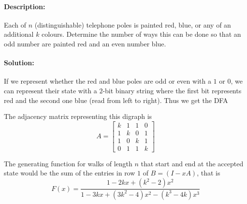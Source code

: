 \documentclass[a4paper,notitlepage]{article}
\theoremstyle{plain}
\theoremstyle{definition}
\begin{document}
\paragraph{Description:}
Each of $n$ (distinguishable) telephone poles is painted red, blue, or any of an additional $k$ colours. Determine the number of ways this can be done so that an odd number are painted red and an even number blue.

\paragraph{Solution:}
If we represent whether the red and blue poles are odd or even with a $1$ or $0$, we can represent their state with a $2$-bit binary string where the first bit represents red and the second one blue (read from left to right). Thus we get the DFA

\begin{center}
\end{center}

The adjacency matrix representing this digraph is
\begin{equation*}
    A = \begin{bmatrix}
        k & 1 & 1 & 0 \\
        1 & k & 0 & 1 \\
        1 & 0 & k & 1 \\
        0 & 1 & 1 & k
    \end{bmatrix}
\end{equation*}

The generating function for walks of length $n$ that start and end at the accepted state would be the sum of the entries in row $1$ of $B=(I-xA)$, that is
\begin{equation*}
    F(x) = \frac{1-2kx+(k^2-2)x^2}{1-3kx + (3k^2-4)x^2-(k^3-4k)x^3}
\end{equation*}
\end{document}
